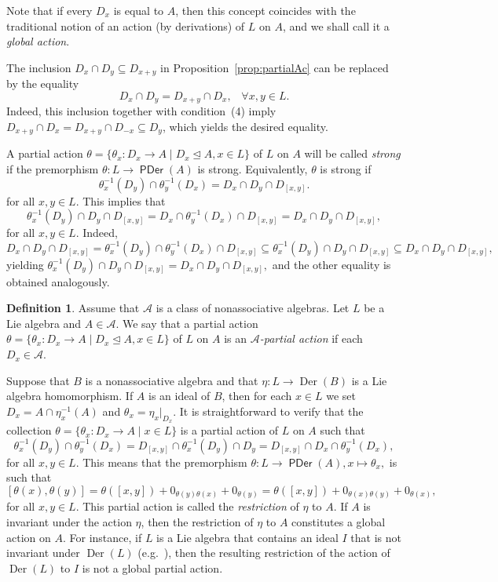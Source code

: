 \documentclass{amsart}
\newcommand{\0}{{\vartheta}}
\theoremstyle{definition}
\newtheorem{defn}[thm]{Definition}
\theoremstyle{remark}
\numberwithin{equation}{section}
\newtheorem*{Theorem A}{\textbf{Theorem A}}
\newtheorem*{Corollary E}{\textbf{Corollary E}}
\newtheorem*{Corollary F}{\textbf{Corollary F}}
\newtheorem*{Theorem B}{\textbf{Theorem B}}
\newtheorem*{Theorem C}{\textbf{Theorem C}}
\newtheorem*{Theorem D}{\textbf{Theorem B}}
\newtheorem*{p a}{\textbf{Proof of  Theorem A}}
\newtheorem*{p b}{\textbf{Proof of Theorem B}}
\newtheorem*{p c}{\textbf{Proof of  Theorem C}}
\newtheorem*{p d}{\textbf{Proof of  Theorem D}}
\DeclareMathOperator{\der}{Der}
\DeclareMathOperator{\pde}{\textsf{PDer}}
\begin{document}
Note that if every $D_x$ is equal to $A$, then this concept coincides with the traditional notion of an action (by derivations) of $L$ on $A$, and we shall call it a {\em global action}. 


The inclusion $D_x\cap D_y\subseteq D_{x+y}$ in  Proposition~\ref{prop:partialAc} can be replaced by the equality $$D_x\cap D_y=D_{x+y}\cap D_x, \;\;\; \forall x,y \in L.$$
 Indeed, this inclusion together with condition~(4) imply $D_{x+y}\cap D_{x}=D_{x+y}\cap D_{-x}\subseteq D_y$, which yields the desired equality.

A partial action $\theta=\{\theta_x: D_{x} \rightarrow A\mid D_x\unlhd A, x\in L \}$ of $L$ on $A$ will be called {\em strong }  if  the premorphism 
$\theta : L \to  \pde(A)$ is strong. Equivalently, 
$\theta $ is strong if 
$$\theta_x^{-1} (D_{y} )\cap \theta_{y}^{-1} (D_x)=D_x\cap D_y \cap D_{[x,y]}.$$
for all $x,y\in L.$ This implies that
$$ \theta^{-1}_x(D_y)\cap D_y  \cap D_{[x,y]} =
D_x \cap \theta^{-1}_y (D_x)  \cap D_{[x,y]} = D_x\cap D_y \cap D_{[x,y]}, $$ for all $x, y\in L$. 
Indeed,  
$$D_x\cap D_y  \cap D_{[x,y]}=\theta_x^{-1} (D_{y} )\cap \theta_{y}^{-1} (D_x) \cap D_{[x,y]} \subseteq \theta^{-1}_x(D_y)\cap D_y \cap D_{[x,y]} \subseteq D_x\cap D_y \cap D_{[x,y]},$$
yielding $\theta^{-1}_x(D_y)\cap D_y \cap D_{[x,y]} = D_x\cap D_y \cap D_{[x,y]},$ and the other equality is obtained analogously.

\begin{defn}
Assume that $\mathcal A$  is a class of nonassociative algebras. Let $L$ be a Lie algebra and $A\in \mathcal{A}$. We say that a  partial action  $\theta=\{\theta_x: D_{x} \rightarrow A\mid D_x\unlhd A, x\in L \}$ of $L$ on $A$ is an {\em $\mathcal{A}$-partial action} if  each $D_x\in \mathcal{A}$.
\end{defn}

Suppose that $B$ is a nonassociative algebra and that $\eta: L\to \der(B)$ is a Lie algebra homomorphism. If $A$ is an ideal of $B$, then for each $x\in L$ we set  $D_x=A\cap \eta_x^{-1}(A)$ and $\theta_x=\eta_x|_{{D_x}}.$ It is straightforward to verify that the collection $\theta=\{\theta_x: D_{x} \rightarrow A\mid x\in L \}$ is a partial action of $L$ on $A$  such that 
$$\theta_x^{-1} (D_{y} )\cap \theta_{y}^{-1} (D_x)= D_{[x,y]}\cap \theta_x^{-1} (D_{y} )\cap D_y =
D_{[x,y]} \cap D_x \cap \theta_y^{-1} (D_{x} ) , $$ for all $x,y\in L.$ This means that the premorphism 
$\theta: L\to \pde(A), x \mapsto \theta _x ,$ is such that 
$$[\theta(x),\theta(y)]=\theta([x,y])+0_{\theta(y)\theta(x)}+0_{\theta(y)} =\theta([x,y])+0_{\theta(x)\theta(y)}+0_{\theta(x)},$$ for all $x,y\in L.$
This partial action is called the {\em restriction } of $\eta$ to $A$. If $A$ is invariant under the action $\eta$, then the restriction of $\eta$ to $A$ constitutes a global action on $A$. For instance,  if $L$ is a Lie algebra that contains an ideal $I$ that is not invariant under $\der(L)$ (e.g.~\cite[p. 75]{Ja}), then the resulting restriction of the action of $\der(L)$ to $I$ is not a  global partial action.
\end{document}
